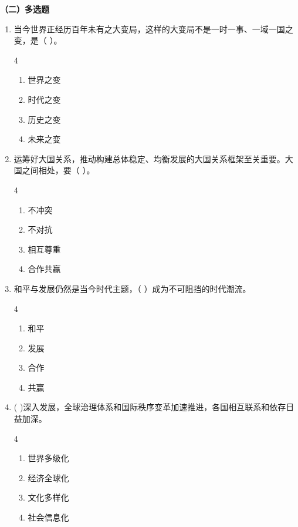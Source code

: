\documentclass[a4paper,11pt]{ctexart}
\begin{document}
\textbf{（二）多选题}
\begin{enumerate}
    \item 当今世界正经历百年未有之大变局，这样的大变局不是一时一事、一域一国之变，是（ ）。
    \begin{multicols}{4}
    \begin{enumerate}
        \item 世界之变
        \item 时代之变
        \item 历史之变
        \item 未来之变
    \end{enumerate}
    \end{multicols}

    \item 运筹好大国关系，推动构建总体稳定、均衡发展的大国关系框架至关重要。大国之间相处，要（ ）。
    \begin{multicols}{4}
    \begin{enumerate}
        \item 不冲突
        \item 不对抗
        \item 相互尊重
        \item 合作共赢
    \end{enumerate}
    \end{multicols}

    \item 和平与发展仍然是当今时代主题，（ ）成为不可阻挡的时代潮流。
    \begin{multicols}{4}
    \begin{enumerate}
        \item 和平
        \item 发展
        \item 合作
        \item 共赢
    \end{enumerate}
    \end{multicols}

    \item ( )深入发展，全球治理体系和国际秩序变革加速推进，各国相互联系和依存日益加深。
    \begin{multicols}{4}
    \begin{enumerate}
        \item 世界多级化
        \item 经济全球化
        \item 文化多样化
        \item 社会信息化
    \end{enumerate}
    \end{multicols}


\end{enumerate}
\end{document}
